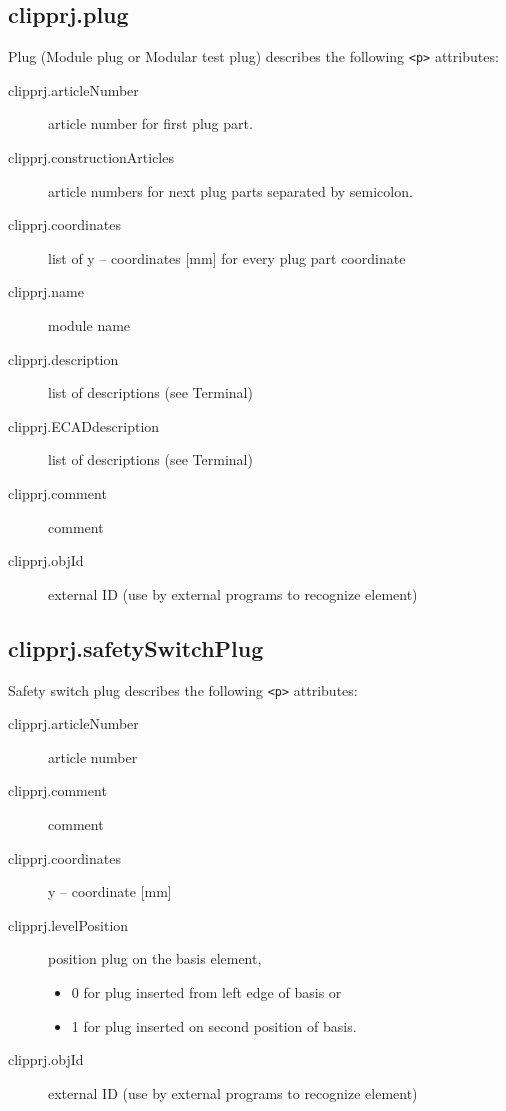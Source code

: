 \documentclass[%
	a4paper,
	oneside,
	listof=numbered,
	parskip=half,
	headsepline=true,
	footsepline=false,
	0.7headlines,
	]{scrbook}
\begin{document}
\subsection{clipprj.plug}
 
Plug (Module plug or Modular test plug) describes the following \verb|<p>| attributes: 

\begin{description}
	\item[clipprj.articleNumber] article number for first plug part. 
	\item[clipprj.constructionArticles] article numbers for next plug parts separated by semicolon. 
	\item[clipprj.coordinates] list of y – coordinates [mm] for every plug part coordinate
	\item[clipprj.name] module name 
	\item[clipprj.description] list of descriptions (see Terminal) 
	\item[clipprj.ECADdescription] list of descriptions (see Terminal) 
	\item[clipprj.comment] comment 
	\item[clipprj.objId] external ID (use by external programs to recognize element) 
\end{description}

\subsection{clipprj.safetySwitchPlug}
 
Safety switch plug describes the following \verb|<p>| attributes: 

\begin{description}
	\item[clipprj.articleNumber] article number 
	\item[clipprj.comment] comment 
	\item[clipprj.coordinates] y – coordinate [mm] 
	\item[clipprj.levelPosition] position plug on the basis element,
	\begin{itemize}
		\item 0 for plug inserted from left edge of basis or
		\item 1 for plug inserted on second position of basis.
	\end{itemize} 
	\item[clipprj.objId] external ID (use by external programs to recognize element) 
\end{description}
\end{document}
